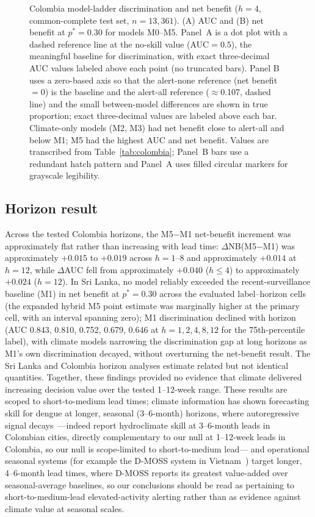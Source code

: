 \documentclass[11pt,a4paper]{article}
\begin{document}
\begin{figure}[htbp]
\begin{tikzpicture}
\end{tikzpicture}
\caption{Colombia model-ladder discrimination and net benefit ($h=4$, common-complete test set, $n=13{,}361$). (A) AUC and (B) net benefit at $p^*=0.30$ for models M0--M5. Panel~A is a dot plot with a dashed reference line at the no-skill value (AUC${}=0.5$), the meaningful baseline for discrimination, with exact three-decimal AUC values labeled above each point (no truncated bars). Panel B uses a zero-based axis so that the alert-none reference (net benefit $=0$) is the baseline and the alert-all reference ($\approx$0.107, dashed line) and the small between-model differences are shown in true proportion; exact three-decimal values are labeled above each bar. Climate-only models (M2, M3) had net benefit close to alert-all and below M1; M5 had the highest AUC and net benefit. Values are transcribed from Table~\ref{tab:colombia}; Panel~B bars use a redundant hatch pattern and Panel~A uses filled circular markers for grayscale legibility.}
\label{fig:colombia}
\end{figure}

\subsection{Horizon result}
Across the tested Colombia horizons, the M5$-$M1 net-benefit increment was approximately flat rather than increasing with lead time: $\Delta$NB(M5$-$M1) was approximately $+0.015$ to $+0.019$ across $h=1$--8 and approximately $+0.014$ at $h=12$, while $\Delta$AUC fell from approximately $+0.040$ ($h\le4$) to approximately $+0.024$ ($h=12$). In Sri Lanka, no model reliably exceeded the recent-surveillance baseline (M1) in net benefit at $p^*=0.30$ across the evaluated label--horizon cells (the expanded hybrid M5 point estimate was marginally higher at the primary cell, with an interval spanning zero); M1 discrimination declined with horizon (AUC 0.843, 0.810, 0.752, 0.679, 0.646 at $h=1,2,4,8,12$ for the 75th-percentile label), with climate models narrowing the discrimination gap at long horizons as M1's own discrimination decayed, without overturning the net-benefit result. The Sri Lanka and Colombia horizon analyses estimate related but not identical quantities. Together, these findings provided no evidence that climate delivered increasing decision value over the tested 1--12-week range. These results are scoped to short-to-medium lead times; climate information has shown forecasting skill for dengue at longer, seasonal (3--6-month) horizons, where autoregressive signal decays~\cite{Beal2025,ColonGonzalez2021}---indeed \cite{Beal2025} report hydroclimate skill at 3--6-month leads in Colombian cities, directly complementary to our null at 1--12-week leads in Colombia, so our null is scope-limited to short-to-medium lead--- and operational seasonal systems (for example the D-MOSS system in Vietnam~\cite{Campbell2026}) target longer, 4--6-month lead times, where D-MOSS reports its greatest value-added over seasonal-average baselines, so our conclusions should be read as pertaining to short-to-medium-lead elevated-activity alerting rather than as evidence against climate value at seasonal scales.
\end{document}
